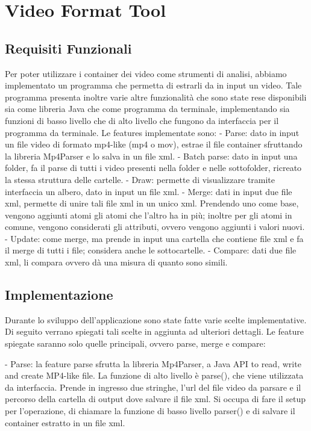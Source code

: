 \section{Video Format Tool}

\subsection{Requisiti Funzionali}
 
Per poter utilizzare i container dei video come strumenti di analisi, abbiamo implementato un programma che permetta di estrarli da in input un video.
Tale programma presenta inoltre varie altre funzionalità che sono state rese disponibili sia come libreria Java che come programma da terminale, implementando sia funzioni di basso livello che di alto livello che fungono da interfaccia per il programma da terminale.
Le features implementate sono:
- Parse: dato in input un file video di formato mp4-like (mp4 o mov), estrae il file container sfruttando la libreria Mp4Parser e lo salva in un file xml.
- Batch parse: dato in input una folder, fa il parse di tutti i video presenti nella folder e nelle sottofolder, ricreato la stessa struttura delle cartelle.
- Draw: permette di visualizzare tramite interfaccia un albero, dato in input un file xml.
- Merge: dati in input due file xml, permette di unire tali file xml in un unico xml. Prendendo uno come base, vengono aggiunti atomi gli atomi che l'altro ha in più; inoltre per gli atomi in comune, vengono considerati gli attributi, ovvero vengono aggiunti i valori nuovi.
- Update: come merge, ma prende in input una cartella che contiene file xml e fa il merge di tutti i file; considera anche le sottocartelle.
- Compare: dati due file xml, li compara ovvero dà una misura di quanto sono simili.


\subsection{Implementazione}

Durante lo sviluppo dell'applicazione sono state fatte varie scelte implementative. Di seguito verrano spiegati tali scelte in aggiunta ad ulteriori dettagli. Le feature spiegate saranno solo quelle principali, ovvero parse, merge e compare:

- Parse:
 la feature parse sfrutta la libreria Mp4Parser, a Java API to read, write and create MP4-like file.
 La funzione di alto livello è parse(), che viene utilizzata da interfaccia. Prende in ingresso due stringhe, l'url del file video da parsare e il percorso della cartella di output dove salvare il file xml. Si occupa di fare il setup per l'operazione, di chiamare la funzione di basso livello parser() e di salvare il container estratto in un file xml.

